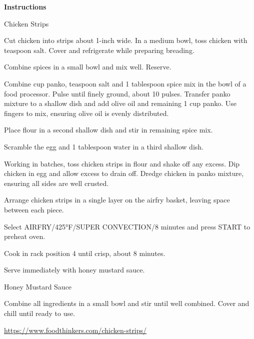 \documentclass[../book.tex]{subfiles}
\begin{document}
\quad
	\begin{minipage}[t]{0.6\textwidth}
		{\bfseries\large Instructions}
		\begin{mydesc}
			\item[Chicken Strips]\hfill
				\begin{myMethod}
					\item Cut chicken into strips about 1-inch wide. In a medium bowl,
						toss chicken with  teaspoon salt. Cover and refrigerate while
						preparing breading.
					\item Combine spices in a small bowl and mix well. Reserve.
					\item Combine  cup panko,  teaspoon salt and 1 tablespoon spice
						mix in the bowl of a food processor. Pulse until finely ground,
						about 10 pulses. Transfer panko mixture to a shallow dish and add
						olive oil and remaining 1 cup panko. Use fingers to mix, ensuring
						olive oil is evenly distributed.
					\item Place flour in a second shallow dish and stir in remaining spice mix.
					\item Scramble the egg and 1 tablespoon water in a third shallow dish.
					\item Working in batches, toss chicken strips in flour and shake off any excess. Dip chicken in egg and allow excess to drain off. Dredge chicken in panko mixture, ensuring all sides are well crusted.
					\item Arrange chicken strips in a single layer on the airfry basket, leaving space between each piece.
					\item Select AIRFRY/425°F/SUPER CONVECTION/8 minutes and press START to preheat oven.
					\item Cook in rack position 4 until crisp, about 8 minutes.
					\item Serve immediately with honey mustard sauce.
				\end{myMethod}
			\item[Honey Mustard Sauce]\hfill
				\begin{myMethod}
					\item Combine all ingredients in a small bowl and stir until well combined. Cover and chill until ready to use.
				\end{myMethod}
		\end{mydesc}
		\vspace{1ex}
	\end{minipage}
\vfill
\centering\url{https://www.foodthinkers.com/chicken-strips/}
\end{document}
